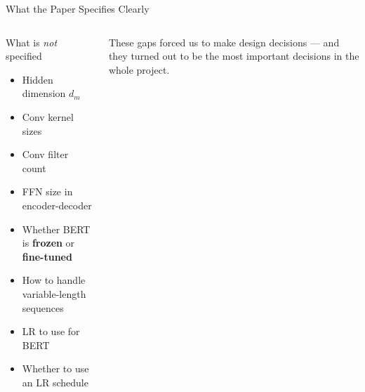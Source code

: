 \documentclass[aspectratio=169]{beamer}
\begin{document}
\begin{frame}{What the Paper Specifies Clearly}
\begin{columns}[T]
      \begin{alertblock}{What is \emph{not} specified}
        \small\begin{itemize}\setlength{\itemsep}{0pt}
          \item Hidden dimension $d_m$
          \item Conv kernel sizes
          \item Conv filter count
          \item FFN size in encoder-decoder
          \item Whether BERT is \textbf{frozen} or \textbf{fine-tuned}
          \item How to handle variable-length sequences
          \item LR to use for BERT
          \item Whether to use an LR schedule
        \end{itemize}
      \end{alertblock}
      \small These gaps forced us to make design decisions — and they turned
      out to be the most important decisions in the whole project.
  \end{columns}
\end{frame}
\end{document}
